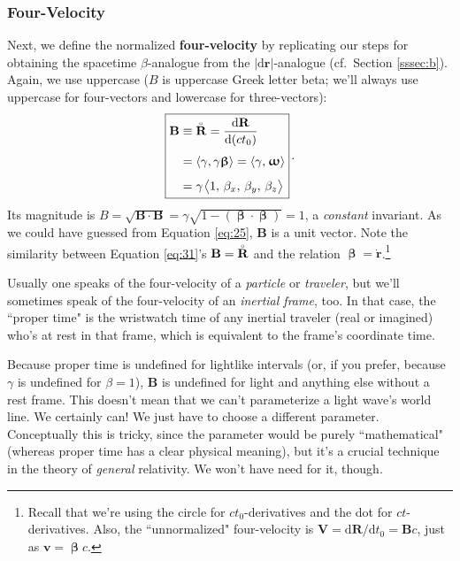\documentclass[12pt]{article}
\renewcommand{\mathring}[1]{\accentset{\circ}{#1}}
\renewcommand{\vv}[1]{\mathbf{#1}}
\newcommand{\dd}[1]{\mathrm{d}#1}
\newcommand{\vvbeta}{\bm{\upbeta}}
\newcommand{\vvomega}{\bm{\upomega}}
\begin{document}
\subsubsection{Four-Velocity}

Next, we define the normalized \textbf{four-velocity} by replicating our steps for obtaining the spacetime $\beta$-analogue from the $\vert \dd \vv r \vert$-analogue (cf.\ Section \ref{sssec:b}). Again, we use uppercase ($B$ is uppercase Greek letter beta; we'll always use uppercase for four-vectors and lowercase for three-vectors):
\begin{equation}\label{eq:31}
\boxed{
\begin{aligned}
\vv B&\equiv \mathring{\vv R} = \dfrac{\dd \vv R}{\dd (c t_0)} \\[3pt]
&= \langle \gamma, \gamma \vvbeta \rangle = \langle \gamma, \mkern1mu \vvomega \rangle \\[4pt]
&= \gamma \mkern1.5mu \big \langle 1, \, \beta_x, \, \beta_y, \, \beta_z \big \rangle
\end{aligned}
} \, .
\end{equation}
Its magnitude is $B = \sqrt{\vv B \cdot \vv B} = \gamma \sqrt{1 - (\vvbeta \cdot \vvbeta)} = 1$, a \emph{constant} invariant. As we could have guessed from Equation \ref{eq:25}, $\vv B$ is a unit vector. Note the similarity between Equation \ref{eq:31}'s $\vv B = \mathring{\vv R}$ and the relation $\vvbeta = \dot{\vv r}$.\footnote{Recall that we're using the circle for $c t_0$-derivatives and the dot for $ct$-derivatives. Also, the ``unnormalized" four-velocity is $\vv V = \dd \vv R / \dd t_0 = \vv B c$, just as $\vv v = \vvbeta c$.}

Usually one speaks of the four-velocity of a \emph{particle} or \emph{traveler}, but we'll sometimes speak of the four-velocity of an \emph{inertial frame}, too. In that case, the ``proper time" is the wristwatch time of any inertial traveler (real or imagined) who's at rest in that frame, which is equivalent to the frame's coordinate time.

Because proper time is undefined for lightlike intervals (or, if you prefer, because $\gamma$ is undefined for $\beta = 1$), $\vv B$ is undefined for light and anything else without a rest frame. This doesn't mean that we can't parameterize a light wave's world line. We certainly can! We just have to choose a different parameter. Conceptually this is tricky, since the parameter would be purely ``mathematical" (whereas proper time has a clear physical meaning), but it's a crucial technique in the theory of \emph{general} relativity. We won't have need for it, though.
\end{document}
